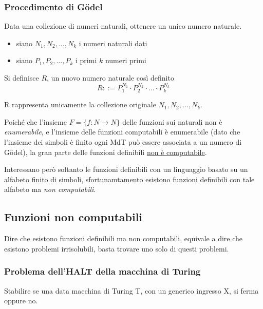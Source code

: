 \subsubsection{Procedimento di Gödel}
Data una collezione di numeri naturali, ottenere un unico numero naturale.

\begin{mdframed}[topline=false,bottomline=false,rightline=false]
    \begin{itemize}
        \item siano $N_1, N_2, \dots, N_k$ i numeri naturali dati
        \item siano $P_1, P_2, \dots, P_k$ i primi $k$ numeri primi
    \end{itemize}
    Si definisce $R$, un nuovo numero naturale così definito
    \begin{equation*}
        R ::= P_1^{N_1} \cdot P_2^{N_2} \cdot \dots \cdot P_k^{N_k}
    \end{equation*}
\end{mdframed}
R rappresenta unicamente la collezione originale $N_1, N_2, \dots, N_k$.

Poiché che l'insieme $F=\{f: N \rightarrow N\}$ delle funzioni sui naturali non è \textit{enumerabile}, e l'insieme delle funzioni computabili è enumerabile (dato che l'insieme dei simboli è finito ogni MdT può essere associata a un numero di Gödel), la gran parte delle funzioni definibili \underline{non è computabile}.

Interessano però soltanto le funzioni definibili con un linguaggio basato su un alfabeto finito di simboli, sfortunamtamento esistono funzioni definibili con tale alfabeto ma \textit{non computabili}.

\subsection{Funzioni non computabili}
Dire che esistono funzioni definibili ma non computabili, equivale a dire che esistono problemi irrisolubili, basta trovare uno solo di questi problemi.

\subsubsection{Problema dell'HALT della macchina di Turing}
\begin{mdframed}[topline=false,bottomline=false,rightline=false]
    Stabilire se una data macchina di Turing T, con un generico ingresso X, si ferma oppure no.
\end{mdframed}

